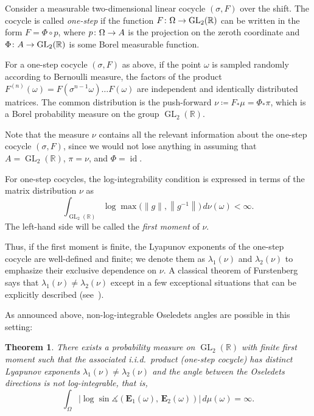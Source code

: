 \documentclass[10pt]{amsart}
\newtheorem{theo}{Theorem}[section]
\theoremstyle{definition}\newtheorem{defi}[theo]{Definition}\newtheorem{rema}[theo]{Remark}\newtheorem{exam}[theo]{Example}\newtheorem{exem}[theo]{Example}\newtheorem{nota}[theo]{Notation}
\newcommand{\R}{\mathbb{R}}
\newcommand{\E}{\mathbf{E}}
\DeclareMathOperator{\GL}{GL}
\DeclareMathOperator{\idd}{id}
\renewcommand{\angle}{\measuredangle}
\renewcommand*{\to}{\mathchoice{\longrightarrow}{\rightarrow}{\rightarrow}{\rightarrow}}
\begin{document}
Consider a measurable two-dimensional linear cocycle $(\sigma, F)$ over the shift. The cocycle is called \emph{one-step} if the function $F \colon \Omega \to \GL_2(\R)$ can be written in the form $F = \Phi \circ p$, where $p \colon \Omega \to A$ is the projection on the zeroth coordinate and $\Phi \colon A \to \GL_2(\R)$ is some Borel measurable function.

For a one-step cocycle $(\sigma, F)$ as above, if the point $\omega$ is sampled randomly according to Bernoulli measure, the factors of the product $F^{(n)}(\omega) = F(\sigma^{n-1} \omega) \dots F(\omega)$ are independent and identically distributed matrices. The common distribution is the push-forward $\nu \coloneqq F_* \mu = \Phi_* \pi$, which is a Borel probability measure on the group $\GL_2(\R)$.

Note that the measure $\nu$ contains all the relevant information about the one-step cocycle $(\sigma,F)$, since we would not lose anything in assuming that $A = \GL_2(\R)$, $\pi = \nu$, and $\Phi = \idd$.

For one-step cocycles, the log-integrability condition is expressed in terms of the matrix distribution $\nu$ as
\begin{equation}
\int_{\GL_2(\R)} \log \max \bigl(\|g\|, \left\|g^{-1}\right\| \bigr) \, d\nu(\omega) < \infty.
\end{equation}
The left-hand side will be called the \emph{first moment} of $\nu$.

Thus, if the first moment is finite, the Lyapunov exponents of the one-step cocycle are well-defined and finite; we denote them as $\lambda_1(\nu)$ and $\lambda_2(\nu)$ to emphasize their exclusive dependence on $\nu$. A classical theorem of Furstenberg says that $\lambda_1(\nu) \neq \lambda_2(\nu)$ except in a few exceptional situations that can be explicitly described (see~\cite{DF,ledrappier}).

As announced above, non-log-integrable Oseledets angles are possible in this setting:

\begin{theo}\label{t.nonintegrable}
There exists a probability measure on $\GL_2(\R)$ with finite first moment such that the associated i.i.d.~product (one-step cocycle) has distinct Lyapunov exponents $\lambda_1(\nu) \neq \lambda_2(\nu)$ and the angle between the Oseledets directions is not log-integrable, that is,
\begin{equation}
\int_{\Omega}\left|\log\sin \angle\left(\E_1(\omega),\,\E_2(\omega)\right) \right|\, d\mu(\omega) = \infty.
\end{equation}
\end{theo}
\end{document}
